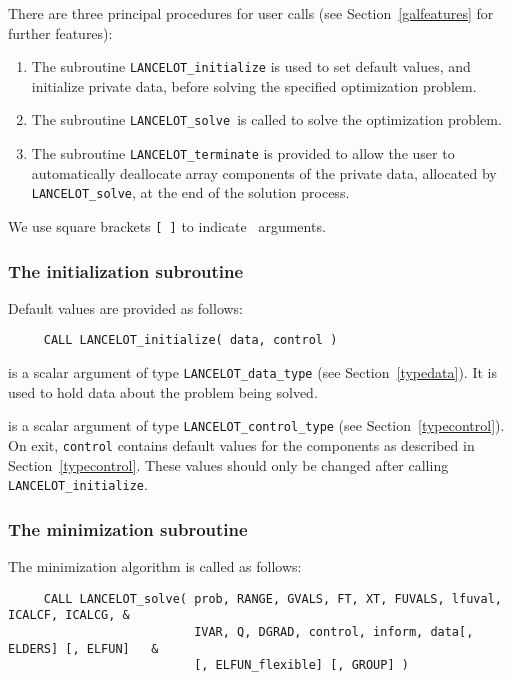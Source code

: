 \documentclass{galahad}
\newcommand{\fullpackagename}{LANC\-E\-LOT}
\newcommand{\solver}{{\tt \fullpackagename\_solve}}
\begin{document}

\galarguments
There are three principal procedures for user calls
(see Section~\ref{galfeatures} for further features):

\begin{enumerate}
\item The subroutine
      {\tt \fullpackagename\_initialize}
      is used to set default values, and initialize private data,
      before solving the specified optimization problem.
\item The subroutine
      \solver\
      is called to solve the optimization problem.
\item The subroutine
      {\tt \fullpackagename\_terminate}
      is provided to allow the user to automatically deallocate array
       components of the private data, allocated by
       \solver,
       at the end of the solution process.
\end{enumerate}
We use square brackets {\tt [ ]} to indicate \optional\ arguments.


\subsubsection{The initialization subroutine}\label{subinit}
 Default values are provided as follows:
\hskip0.5in
\def\baselinestretch{0.8} {\tt \begin{verbatim}
     CALL LANCELOT_initialize( data, control )
\end{verbatim}}
\def\baselinestretch{1.0}

\begin{description}
 is a scalar \intentinout argument of type
{\tt \fullpackagename\_data\_type}
(see Section~\ref{typedata}). It is used to hold data about the problem being
solved.

 is a scalar \intentout argument of type
{\tt \fullpackagename\_control\_type}
(see Section~\ref{typecontrol}).
On exit, {\tt control} contains default values for the components as
described in Section~\ref{typecontrol}.
These values should only be changed after calling
{\tt \fullpackagename\_initialize}.

\end{description}


\subsubsection{The minimization subroutine\label{min}}
The minimization algorithm is called as follows:
\hskip0.5in
\def\baselinestretch{0.8} {\tt \begin{verbatim}
     CALL LANCELOT_solve( prob, RANGE, GVALS, FT, XT, FUVALS, lfuval, ICALCF, ICALCG, &
                          IVAR, Q, DGRAD, control, inform, data[, ELDERS] [, ELFUN]   &
                          [, ELFUN_flexible] [, GROUP] )
\end{verbatim}}
\def\baselinestretch{1.0}
\end{document}
